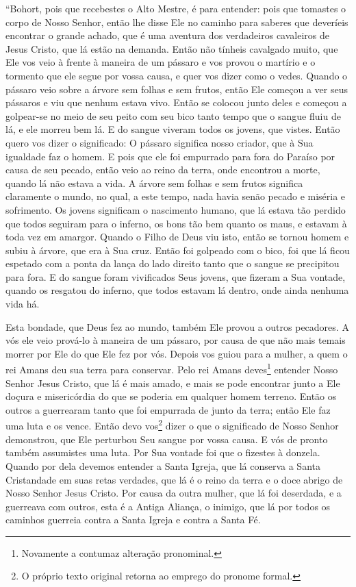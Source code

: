 “Bohort, pois que recebestes o Alto Mestre, é para entender: pois que tomastes o
corpo de Nosso Senhor, então lhe disse Ele no caminho para saberes que
deveríeis encontrar o grande achado, que é uma aventura dos verdadeiros
cavaleiros de Jesus Cristo, que lá estão na demanda. Então não tínheis
cavalgado muito, que Ele vos veio à frente à maneira de um pássaro e vos provou
o martírio e o tormento que ele segue por vossa causa, e quer vos dizer como o
vedes. Quando o pássaro veio sobre a árvore sem folhas e sem frutos, então Ele
começou a ver seus pássaros e viu que nenhum estava vivo. Então se colocou
junto deles e começou a golpear-se no meio de seu peito com seu bico tanto
tempo que o sangue fluiu de lá, e ele morreu bem lá. E do sangue viveram todos
os jovens, que vistes. Então quero vos dizer o significado: O pássaro significa
nosso criador, que à Sua igualdade faz o homem. E pois que ele foi empurrado
para fora do Paraíso por causa de seu pecado, então veio ao reino da terra,
onde encontrou a morte, quando lá não estava a vida. A árvore sem folhas e sem
frutos significa claramente o mundo, no qual, a este tempo, nada havia senão
pecado e miséria e sofrimento. Os jovens significam o nascimento humano, que lá
estava tão perdido que todos seguiram para o inferno, os bons tão bem quanto os
maus, e estavam à toda vez em amargor. Quando o Filho de Deus viu isto, então
se tornou homem e subiu à árvore, que era à Sua cruz. Então foi golpeado com o
bico, foi que lá ficou espetado com a ponta da lança do lado direito tanto que
o sangue se precipitou para fora. E do sangue foram vivificados Seus jovens,
que fizeram a Sua vontade, quando os resgatou do inferno, que todos estavam lá
dentro, onde ainda nenhuma vida há. 

Esta bondade, que Deus fez ao mundo, também Ele provou a outros pecadores. A vós
ele veio prová-lo à maneira de um pássaro, por causa de que não mais temais
morrer por Ele do que Ele fez por vós. Depois vos guiou para a mulher, a quem o
rei Amans deu sua terra para conservar. Pelo rei Amans deves\footnote{
Novamente a contumaz alteração pronominal. } entender Nosso Senhor
Jesus Cristo, que lá é mais amado, e mais se pode encontrar junto a Ele doçura
e misericórdia do que se poderia em qualquer homem terreno. Então os outros a
guerrearam tanto que foi empurrada de junto da terra; então Ele faz uma luta e
os vence. Então devo vos\footnote{ O próprio texto original retorna ao emprego
do pronome formal.}  dizer o que o significado de Nosso Senhor
demonstrou, que Ele perturbou Seu sangue por vossa causa. E vós de pronto
também assumistes uma luta. Por Sua vontade foi que o fizestes à donzela.
Quando por dela devemos entender a Santa Igreja, que lá conserva a Santa
Cristandade em suas retas verdades, que lá é o reino da terra e o doce abrigo
de Nosso Senhor Jesus Cristo. Por causa da outra mulher, que lá foi deserdada,
e a guerreava com outros, esta é a Antiga Aliança, o inimigo, que lá por todos
os caminhos guerreia contra a Santa Igreja e contra a Santa Fé.

